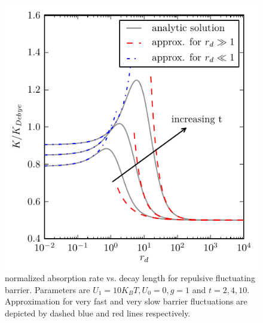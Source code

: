 \documentclass[twocolumn,superscriptaddress]{revtex4}
\begin{document}
\begin{figure}[H]
\includegraphics[width= .5 \textwidth]{plots/rep_barrier.pdf}
\caption{normalized absorption rate vs. decay length for repulsive fluctuating barrier. \newline Parameters are $U_1 = 10 K_B T, U_0 = 0, g = 1$ and $t=2,4,10$. Approximation for very fast and very slow barrier fluctuations are depicted by dashed blue and red lines respectively.}
\label{fig2}
\end{figure}
\end{document}
